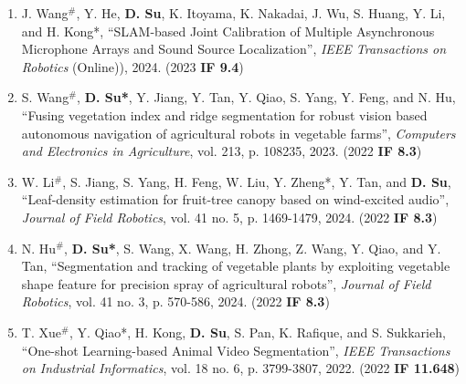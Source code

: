 \documentclass[margin,line]{res}
\begin{document}
\begin{resume}
\begin{enumerate}

\item J. Wang$^{\#}$, Y. He, \textbf{D. Su}, K. Itoyama, K. Nakadai, J. Wu, S. Huang, Y. Li, and H. Kong*, ``SLAM-based Joint Calibration of Multiple Asynchronous Microphone Arrays and Sound Source Localization'', {\it IEEE Transactions on Robotics} (Online)), 2024. (2023 \textbf{IF 9.4})

\item S. Wang$^{\#}$, \textbf{D. Su*}, Y. Jiang, Y. Tan, Y. Qiao, S. Yang, Y. Feng, and N. Hu, ``Fusing vegetation index and ridge segmentation for robust vision based autonomous navigation of agricultural robots in vegetable farms'', {\it Computers and Electronics in Agriculture}, vol. 213, p. 108235, 2023. (2022 \textbf{IF 8.3})

\item W. Li$^{\#}$, S. Jiang, S. Yang, H. Feng, W. Liu, Y. Zheng*, Y. Tan, and \textbf{D. Su}, ``Leaf-density estimation for fruit-tree canopy based on wind-excited audio'', {\it Journal of Field Robotics}, vol. 41 no. 5, p. 1469-1479, 2024. (2022 \textbf{IF 8.3})

\item N. Hu$^{\#}$,  \textbf{D. Su*}, S. Wang, X. Wang, H. Zhong, Z. Wang, Y. Qiao, and Y. Tan, ``Segmentation and tracking of vegetable plants by exploiting vegetable shape feature for precision spray of agricultural robots'', {\it Journal of Field Robotics}, vol. 41 no. 3, p. 570-586, 2024. (2022 \textbf{IF 8.3})

\item T. Xue$^{\#}$, Y. Qiao*, H. Kong, \textbf{D. Su}, S. Pan, K. Rafique, and S. Sukkarieh, ``One-shot Learning-based Animal Video Segmentation'', {\it IEEE Transactions on Industrial Informatics}, vol. 18 no. 6, p. 3799-3807, 2022. (2022 \textbf{IF 11.648})


\end{enumerate}
\end{resume}
\end{document}
